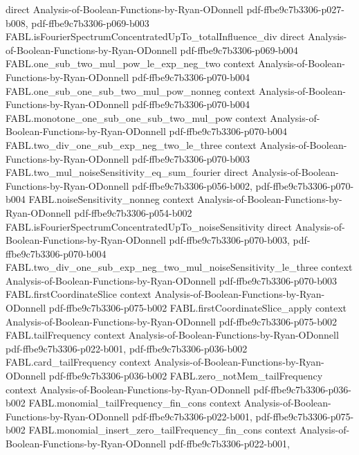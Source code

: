 \begin{theorem}
  {direct}
  {Analysis-of-Boolean-Functions-by-Ryan-ODonnell}
  {pdf-ffbe9c7b3306-p027-b008,
    pdf-ffbe9c7b3306-p069-b003}
\proofstep
  {FABL.isFourierSpectrumConcentratedUpTo_totalInfluence_div}
  {direct}
  {Analysis-of-Boolean-Functions-by-Ryan-ODonnell}
  {pdf-ffbe9c7b3306-p069-b004}
\proofstep
  {FABL.one_sub_two_mul_pow_le_exp_neg_two}
  {context}
  {Analysis-of-Boolean-Functions-by-Ryan-ODonnell}
  {pdf-ffbe9c7b3306-p070-b004}
\proofstep
  {FABL.one_sub_one_sub_two_mul_pow_nonneg}
  {context}
  {Analysis-of-Boolean-Functions-by-Ryan-ODonnell}
  {pdf-ffbe9c7b3306-p070-b004}
\proofstep
  {FABL.monotone_one_sub_one_sub_two_mul_pow}
  {context}
  {Analysis-of-Boolean-Functions-by-Ryan-ODonnell}
  {pdf-ffbe9c7b3306-p070-b004}
\proofstep
  {FABL.two_div_one_sub_exp_neg_two_le_three}
  {context}
  {Analysis-of-Boolean-Functions-by-Ryan-ODonnell}
  {pdf-ffbe9c7b3306-p070-b003}
\proofstep
  {FABL.two_mul_noiseSensitivity_eq_sum_fourier}
  {direct}
  {Analysis-of-Boolean-Functions-by-Ryan-ODonnell}
  {pdf-ffbe9c7b3306-p056-b002,
    pdf-ffbe9c7b3306-p070-b004}
\proofstep
  {FABL.noiseSensitivity_nonneg}
  {context}
  {Analysis-of-Boolean-Functions-by-Ryan-ODonnell}
  {pdf-ffbe9c7b3306-p054-b002}
\proofstep
  {FABL.isFourierSpectrumConcentratedUpTo_noiseSensitivity}
  {direct}
  {Analysis-of-Boolean-Functions-by-Ryan-ODonnell}
  {pdf-ffbe9c7b3306-p070-b003,
    pdf-ffbe9c7b3306-p070-b004}
\proofstep
  {FABL.two_div_one_sub_exp_neg_two_mul_noiseSensitivity_le_three}
  {context}
  {Analysis-of-Boolean-Functions-by-Ryan-ODonnell}
  {pdf-ffbe9c7b3306-p070-b003}
\proofstep
  {FABL.firstCoordinateSlice}
  {context}
  {Analysis-of-Boolean-Functions-by-Ryan-ODonnell}
  {pdf-ffbe9c7b3306-p075-b002}
\proofstep
  {FABL.firstCoordinateSlice_apply}
  {context}
  {Analysis-of-Boolean-Functions-by-Ryan-ODonnell}
  {pdf-ffbe9c7b3306-p075-b002}
\proofstep
  {FABL.tailFrequency}
  {context}
  {Analysis-of-Boolean-Functions-by-Ryan-ODonnell}
  {pdf-ffbe9c7b3306-p022-b001,
    pdf-ffbe9c7b3306-p036-b002}
\proofstep
  {FABL.card_tailFrequency}
  {context}
  {Analysis-of-Boolean-Functions-by-Ryan-ODonnell}
  {pdf-ffbe9c7b3306-p036-b002}
\proofstep
  {FABL.zero_notMem_tailFrequency}
  {context}
  {Analysis-of-Boolean-Functions-by-Ryan-ODonnell}
  {pdf-ffbe9c7b3306-p036-b002}
\proofstep
  {FABL.monomial_tailFrequency_fin_cons}
  {context}
  {Analysis-of-Boolean-Functions-by-Ryan-ODonnell}
  {pdf-ffbe9c7b3306-p022-b001,
    pdf-ffbe9c7b3306-p075-b002}
\proofstep
  {FABL.monomial_insert_zero_tailFrequency_fin_cons}
  {context}
  {Analysis-of-Boolean-Functions-by-Ryan-ODonnell}
  {pdf-ffbe9c7b3306-p022-b001,
}
\end{theorem}
